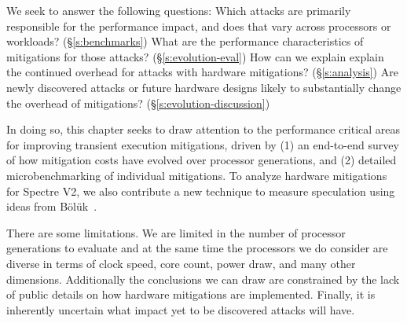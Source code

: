 We seek to answer the following questions: 
Which attacks are primarily responsible for the performance impact, and does that vary across processors or workloads? (\S\ref{s:benchmarks})
What are the performance characteristics of mitigations for those attacks? (\S\ref{s:evolution-eval})
How can we explain explain the continued overhead for attacks with hardware mitigations? (\S\ref{s:analysis})
Are newly discovered attacks or future hardware designs likely to substantially change the overhead of mitigations? (\S\ref{s:evolution-discussion})




In doing so, this chapter seeks to draw attention to the performance critical areas for improving transient execution mitigations, driven by (1) an end-to-end survey of how mitigation costs have evolved over processor generations, and (2) detailed microbenchmarking of individual mitigations.
To analyze hardware mitigations for Spectre V2, we also contribute a new technique to measure speculation using ideas from Bölük~\cite{speculating-x86}.

There are some limitations.
We are limited in the number of processor generations to evaluate and at the same time the processors we do consider are diverse in terms of clock speed, core count, power draw, and many other dimensions.
Additionally the conclusions we can draw are constrained by the lack of public details on how hardware mitigations are implemented.  
Finally, it is inherently uncertain what impact yet to be discovered attacks will have.

